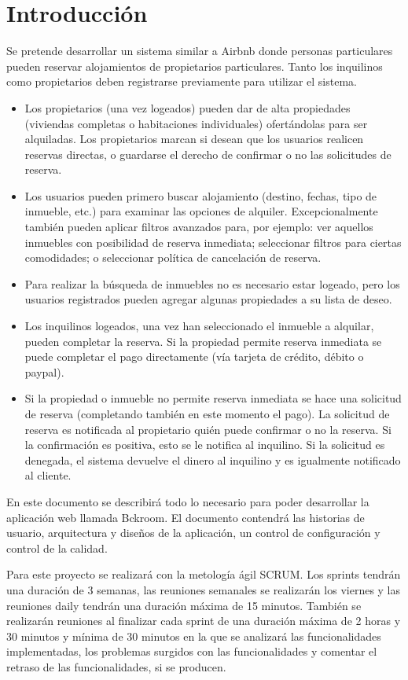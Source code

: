 \section{Introducción}

Se pretende desarrollar un sistema similar a Airbnb donde personas particulares pueden reservar alojamientos de propietarios particulares. Tanto los inquilinos como propietarios deben registrarse previamente para utilizar el sistema.
\begin{itemize}
    \item Los propietarios (una vez logeados) pueden dar de alta propiedades (viviendas completas o habitaciones individuales) ofertándolas para ser alquiladas. Los propietarios marcan si desean que los usuarios realicen reservas directas, o guardarse el derecho de confirmar o no las solicitudes de reserva. 

    \item Los usuarios pueden primero buscar alojamiento (destino, fechas, tipo de inmueble, etc.) para examinar las opciones de alquiler. Excepcionalmente también pueden aplicar filtros avanzados para, por ejemplo: ver aquellos inmuebles con posibilidad de reserva inmediata; seleccionar filtros para ciertas comodidades; o seleccionar política de cancelación de reserva.

    \item Para realizar la búsqueda de inmuebles no es necesario estar logeado, pero los usuarios registrados pueden agregar algunas propiedades a su lista de deseo.

    \item Los inquilinos logeados, una vez han seleccionado el inmueble a alquilar, pueden completar la reserva. Si la propiedad permite reserva inmediata se puede completar el pago directamente (vía tarjeta de crédito, débito o paypal).

    \item Si la propiedad o inmueble no permite reserva inmediata se hace una solicitud de reserva (completando también en este momento el pago). La solicitud de reserva es notificada al propietario quién puede confirmar o no la reserva. Si la confirmación es positiva, esto se le notifica al inquilino. Si la solicitud es denegada, el sistema devuelve el dinero al inquilino y es igualmente notificado al cliente. 
\end{itemize}

En este documento se describirá todo lo necesario para poder desarrollar la aplicación web llamada Bckroom. El documento contendrá las historias de usuario, arquitectura y diseños de la aplicación, un control de configuración y control de la calidad.

Para este proyecto se realizará con la metología ágil SCRUM. Los sprints tendrán una duración de 3 semanas, las reuniones semanales se realizarán los viernes y las reuniones daily tendrán una duración máxima de 15 minutos. También se realizarán reuniones al finalizar cada sprint de una duración máxima de 2 horas y 30 minutos y mínima de 30 minutos en la que se analizará las funcionalidades implementadas, los problemas surgidos con las funcionalidades y comentar el retraso de las funcionalidades, si se producen.